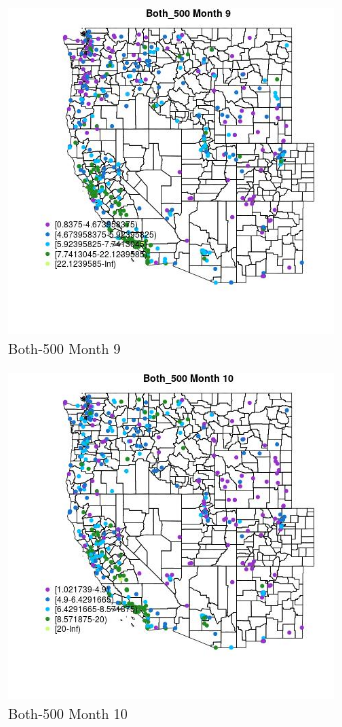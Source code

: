 \begin{figure} 
\centering  
\includegraphics[width=0.77\textwidth]{Code_Outputs/ML_input_report_ML_input_PM25_Step5_part_d_de_duplicated_aves_ML_input_MapObsMo9Both_500.jpg} 
\caption{\label{fig:ML_input_report_ML_input_PM25_Step5_part_d_de_duplicated_aves_ML_inputMapObsMo9Both_500}Both-500 Month 9} 
\end{figure} 
 

\begin{figure} 
\centering  
\includegraphics[width=0.77\textwidth]{Code_Outputs/ML_input_report_ML_input_PM25_Step5_part_d_de_duplicated_aves_ML_input_MapObsMo10Both_500.jpg} 
\caption{\label{fig:ML_input_report_ML_input_PM25_Step5_part_d_de_duplicated_aves_ML_inputMapObsMo10Both_500}Both-500 Month 10} 
\end{figure} 
 

